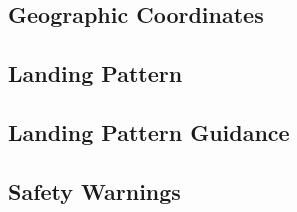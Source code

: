 \subsection{Geographic Coordinates}

\subsection{Landing Pattern}

\subsection{Landing Pattern Guidance}

\subsection{Safety Warnings}

